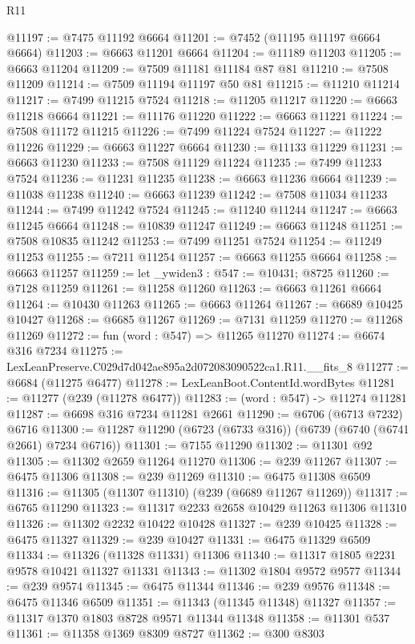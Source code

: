 \begin{lexlean}{R11}
\begin{coremodule}
@11197 := @7475 @11192 @6664
@11201 := @7452 (@11195 @11197 @6664 @6664)
@11203 := @6663 @11201 @6664
@11204 := @11189 @11203
@11205 := @6663 @11204
@11209 := @7509 @11181 @11184 @87 @81
@11210 := @7508 @11209
@11214 := @7509 @11194 @11197 @50 @81
@11215 := @11210 @11214
@11217 := @7499 @11215 @7524
@11218 := @11205 @11217
@11220 := @6663 @11218 @6664
@11221 := @11176 @11220
@11222 := @6663 @11221
@11224 := @7508 @11172 @11215
@11226 := @7499 @11224 @7524
@11227 := @11222 @11226
@11229 := @6663 @11227 @6664
@11230 := @11133 @11229
@11231 := @6663 @11230
@11233 := @7508 @11129 @11224
@11235 := @7499 @11233 @7524
@11236 := @11231 @11235
@11238 := @6663 @11236 @6664
@11239 := @11038 @11238
@11240 := @6663 @11239
@11242 := @7508 @11034 @11233
@11244 := @7499 @11242 @7524
@11245 := @11240 @11244
@11247 := @6663 @11245 @6664
@11248 := @10839 @11247
@11249 := @6663 @11248
@11251 := @7508 @10835 @11242
@11253 := @7499 @11251 @7524
@11254 := @11249 @11253
@11255 := @7211 @11254
@11257 := @6663 @11255 @6664
@11258 := @6663 @11257
@11259 := let _ywiden3 : @547 := @10431; @8725
@11260 := @7128 @11259
@11261 := @11258 @11260
@11263 := @6663 @11261 @6664
@11264 := @10430 @11263
@11265 := @6663 @11264
@11267 := @6689 @10425 @10427
@11268 := @6685 @11267
@11269 := @7131 @11259
@11270 := @11268 @11269
@11272 := fun (word : @547) => @11265 @11270
@11274 := @6674 @316 @7234
@11275 := LexLeanPreserve.C029d7d042ae895a2d072083090522ca1.R11.__fits_8
@11277 := @6684 (@11275 @6477)
@11278 := LexLeanBoot.ContentId.wordBytes
@11281 := @11277 (@239 (@11278 @6477))
@11283 := (word : @547) -> @11274 @11281
@11287 := @6698 @316 @7234 @11281 @2661
@11290 := @6706 (@6713 @7232) @6716
@11300 := @11287 @11290 (@6723 (@6733 @316)) (@6739 (@6740 (@6741 @2661) @7234 @6716))
@11301 := @7155 @11290
@11302 := @11301 @92
@11305 := @11302 @2659 @11264 @11270
@11306 := @239 @11267
@11307 := @6475 @11306
@11308 := @239 @11269
@11310 := @6475 @11308 @6509
@11316 := @11305 (@11307 @11310) (@239 (@6689 @11267 @11269))
@11317 := @6765 @11290
@11323 := @11317 @2233 @2658 @10429 @11263 @11306 @11310
@11326 := @11302 @2232 @10422 @10428
@11327 := @239 @10425
@11328 := @6475 @11327
@11329 := @239 @10427
@11331 := @6475 @11329 @6509
@11334 := @11326 (@11328 @11331) @11306
@11340 := @11317 @1805 @2231 @9578 @10421 @11327 @11331
@11343 := @11302 @1804 @9572 @9577
@11344 := @239 @9574
@11345 := @6475 @11344
@11346 := @239 @9576
@11348 := @6475 @11346 @6509
@11351 := @11343 (@11345 @11348) @11327
@11357 := @11317 @1370 @1803 @8728 @9571 @11344 @11348
@11358 := @11301 @537
@11361 := @11358 @1369 @8309 @8727
@11362 := @300 @8303

\end{coremodule}
\end{lexlean}

